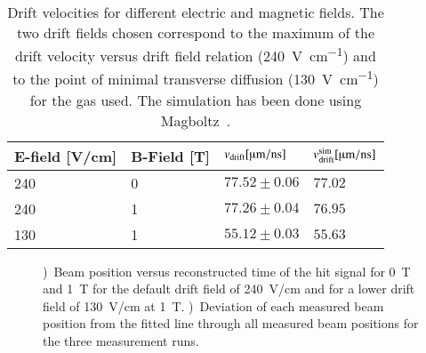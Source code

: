 \documentclass[preprint]{elsarticle}
\begin{document}
\begin{table}[hbt]
\centering
\begin{tabular}{ll|l|l}
\hline
E-field  [\si[per-mode=symbol]{\V \per \cm}] & B-Field [\si{\tesla}]& $v_{\rm drift} [\si[per-mode=symbol]{\um \per \ns}]$ & $v_{\rm drift}^{\rm sim} [\si[per-mode=symbol]{\um \per \ns}]$\\
\hline
240 & 0 & $77.52 \pm 0.06$ & $77.02$ \\
240 & 1 & $77.26 \pm 0.04$ & $76.95$ \\
130 & 1 & $55.12 \pm 0.03$ & $55.63$ \\
\hline
\end{tabular}
\caption{\small\label{tab:drift} Drift velocities for different electric and magnetic fields. The two drift fields chosen correspond to the maximum of the drift velocity versus drift field relation (\SI[per-mode=symbol]{240}{\V \per \cm}) and to the point of minimal transverse diffusion (\SI[per-mode=symbol]{130}{\V \per \cm}) for the gas used. The simulation has been done using Magboltz~\cite{Magboltz}.}
\end{table}


\begin{figure}[tb]
\begin{subfigure}[b]{0.48\textwidth}
\iftoggle{blackandwhite}{\texttt{[image: figures/vDriftBW.pdf]}}{\texttt{[image: figures/vDrift.pdf]}}
\caption{}
\label{sfig:vdrift}
\end{subfigure}
\hfill
\begin{subfigure}[b]{0.48\textwidth}
\iftoggle{blackandwhite}{\texttt{[image: figures/vDrift\_diffBW.pdf]}}{\texttt{[image: figures/vDrift\_diff.pdf]}}
\caption{}
\label{sfig:vdriftDiff}
\end{subfigure}
\caption{\small \protect{})~Beam position versus reconstructed time of the hit signal for \SI{0}{\tesla} and \SI{1}{\tesla} for the default drift field of \SI{240}{V/cm} and for a lower drift field of \SI{130}{V/cm} at \SI{1}{\tesla}. \protect{})~Deviation of each measured beam position from the fitted line through all measured beam positions for the three measurement runs.}
\label{fig:vdrift}
\end{figure}
\end{document}
